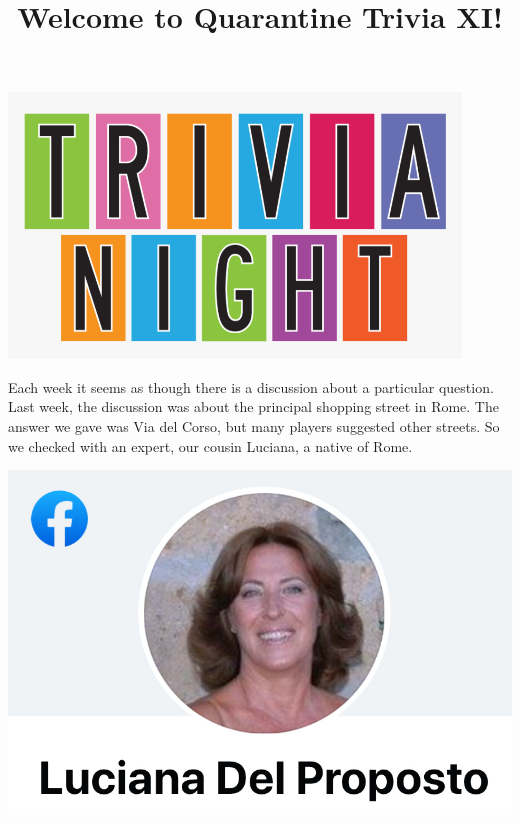 \documentclass[11pt]{beamer}
\begin{document}
\title{Welcome to Quarantine Trivia XI!}
\date{}

\begin{frame}
\titlepage{}
\begin{center}
\includegraphics[max width=0.9\textwidth,
    max height=0.4\textheight]{Images/triviatitleframelogo.png}
\end{center}
\end{frame}
\begin{frame}
Each week it seems as though there is a discussion about a particular question. Last
week, the discussion was about the principal shopping street in Rome. The answer we gave
was Via del Corso, but many players suggested other streets. So we checked with an
expert, our cousin Luciana, a native of Rome.

\begin{center}
\includegraphics[max width=.9\textwidth,max height=.4\textheight
]{Images/luciana.jpg}
\end{center}
\end{frame}
\end{document}
